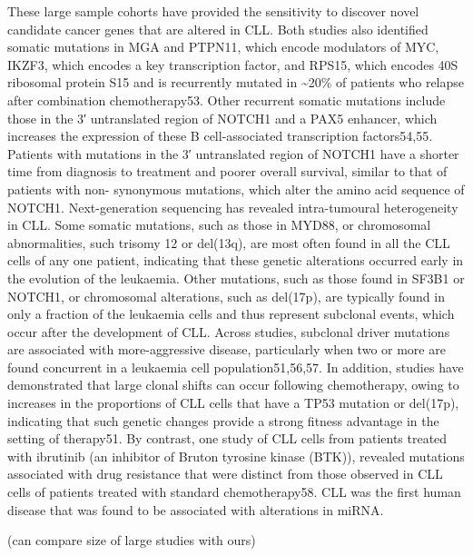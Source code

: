 \documentclass[11pt, a4paper, twosided]{book}
\begin{document}
These large sample cohorts have provided the sensitivity to discover novel candidate cancer genes that are altered in CLL. Both studies also identified somatic mutations in MGA and PTPN11, which encode modulators of MYC, IKZF3, which encodes a key transcription factor, and RPS15, which encodes 40S ribosomal protein S15 and is recurrently mutated in \textasciitilde20\% of patients who relapse after combination chemotherapy53. Other recurrent somatic mutations include those in the 3′ untranslated region of NOTCH1 and a PAX5 enhancer, which increases the expression of these B cell-associated transcription factors54,55. Patients with mutations in the 3′ untranslated region of NOTCH1 have a shorter time from diagnosis to treatment and poorer overall survival, similar to that of patients with non- synonymous mutations, which alter the amino acid sequence of NOTCH1.
Next-generation sequencing has revealed intra-tumoural heterogeneity in CLL. Some somatic mutations, such as those in MYD88, or chromosomal abnormalities, such trisomy 12 or del(13q), are most often found in all the CLL cells of any one patient, indicating that these genetic alterations occurred early in the evolution of the leukaemia. Other mutations, such as those found in SF3B1 or NOTCH1, or chromosomal alterations, such as del(17p), are typically found in only a fraction of the leukaemia cells and thus represent subclonal events, which occur after the development of CLL. Across studies, subclonal driver mutations are associated with more-aggressive disease, particularly when two or more are found concurrent in a leukaemia cell population51,56,57. In addition, studies have demonstrated that large clonal shifts can occur following chemotherapy, owing to increases in the proportions of CLL cells that have a TP53 mutation or del(17p), indicating that such genetic changes provide a strong fitness advantage in the setting of therapy51. By contrast, one study of CLL cells from patients treated with ibrutinib (an inhibitor of Bruton tyrosine kinase (BTK)), revealed mutations associated with drug resistance that were distinct from those observed in CLL cells of patients treated with standard chemotherapy58. CLL was the first human disease that was found to be associated with alterations in miRNA.

(can compare size of large studies with ours)
\end{document}
